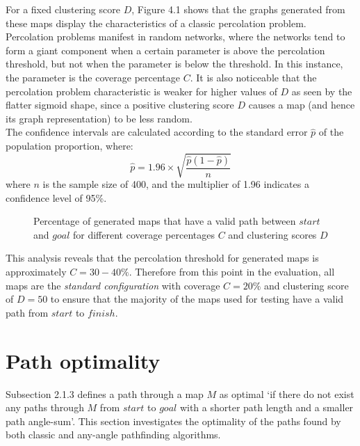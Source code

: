 \documentclass[12pt,notitlepage]{report}
\begin{document}
\noindent
For a fixed clustering score $D$, Figure 4.1 shows that the graphs generated from these maps display the characteristics of a classic percolation problem\cite{Grimmett99}. Percolation problems manifest in random networks, where the networks tend to form a giant component when a certain parameter is above the percolation threshold, but not when the parameter is below the threshold. In this instance, the parameter is the coverage percentage $C$. It is also noticeable that the percolation problem characteristic is weaker for higher values of $D$ as seen by the flatter sigmoid shape, since a positive clustering score $D$ causes a map (and hence its graph representation) to be less random.\\

\noindent
The confidence intervals are calculated according to the standard error $\hat{p}$ of the population proportion\cite{PennState}, where:
\begin{equation}
\hat{p} = 1.96 \times \sqrt{\frac{\hat{p}(1-\hat{p})}{n}}
\end{equation}
where $n$ is the sample size of 400, and the multiplier of 1.96 indicates a confidence level of 95\%.\\

\begin{figure}
\centering

\caption[Percentage of generated maps that have a valid path between $start$ and $goal$]{Percentage of generated maps that have a valid path between $start$ and $goal$ for different coverage percentages $C$ and clustering scores $D$}
\end{figure}

\noindent
This analysis reveals that the percolation threshold for generated maps is approximately $C=30-40\%$. Therefore from this point in the evaluation, all maps are the {\em standard configuration} with coverage $C=20\%$ and clustering score of $D=50$ to ensure that the majority of the maps used for testing have a valid path from $start$ to $finish$.

\section{Path optimality}

Subsection 2.1.3 defines a path through a map $M$ as optimal `if there do not exist any paths through $M$ from $start$ to $goal$ with a shorter path length and a smaller path angle-sum'. This section investigates the optimality of the paths found by both classic and any-angle pathfinding algorithms.\\
\end{document}
